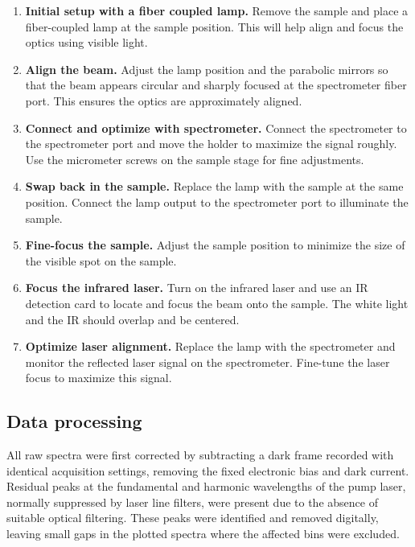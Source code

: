 \documentclass[
	parskip=half,
	a4paper,
]{scrarticle}
\begin{document}
\begin{enumerate}
  \item \textbf{Initial setup with a fiber coupled lamp.}  
  Remove the sample and place a fiber-coupled lamp at the sample position. This will help align and focus the optics using visible light.

  \item \textbf{Align the beam.}  
  Adjust the lamp position and the parabolic mirrors so that the beam appears circular and sharply focused at the spectrometer fiber port. This ensures the optics are approximately aligned.

  \item \textbf{Connect and optimize with spectrometer.}  
  Connect the spectrometer to the spectrometer port and move the holder to maximize the signal roughly. Use the micrometer screws on the sample stage for fine adjustments.

  \item \textbf{Swap back in the sample.}  
  Replace the lamp with the sample at the same position. Connect the lamp output to the spectrometer port to illuminate the sample.

  \item \textbf{Fine-focus the sample.}  
  Adjust the sample position to minimize the size of the visible spot on the sample.

  \item \textbf{Focus the infrared laser.}  
  Turn on the infrared laser and use an IR detection card to locate and focus the beam onto the sample. The white light and the IR should overlap and be centered.

  \item \textbf{Optimize laser alignment.}  
  Replace the lamp with the spectrometer and monitor the reflected laser signal on the spectrometer. Fine-tune the laser focus to maximize this signal.
\end{enumerate}

\subsection{Data processing}
All raw spectra were first corrected by subtracting a dark frame recorded with identical acquisition settings, removing the fixed electronic bias and dark current.  
Residual peaks at the fundamental and harmonic wavelengths of the pump laser, normally suppressed by laser line filters, were present due to the absence of suitable optical filtering.  
These peaks were identified and removed digitally, leaving small gaps in the plotted spectra where the affected bins were excluded.  
\end{document}
